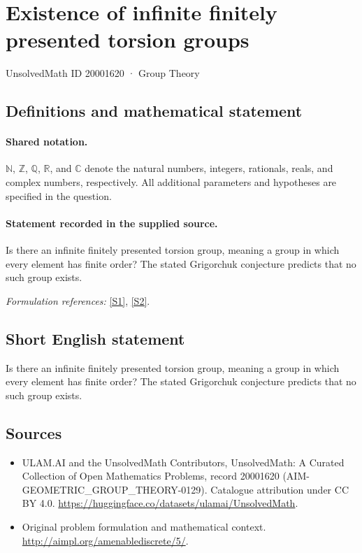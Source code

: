 \documentclass[11pt]{article}
\newcommand{\sref}[2]{\hyperlink{source:#1:#2}{[S#2]}}
\begin{document}
\setcounter{section}{20001619}
\section{Existence of infinite finitely presented torsion groups}\label{20001620}
{\small UnsolvedMath ID 20001620 · Group Theory}
\subsection{Definitions and mathematical statement}

\paragraph{Shared notation.}$\mathbb N$, $\mathbb Z$, $\mathbb Q$, $\mathbb R$, and $\mathbb C$ denote the natural numbers, integers, rationals, reals, and complex numbers, respectively. All additional parameters and hypotheses are specified in the question.


\paragraph{Statement recorded in the supplied source.}
Is there an infinite finitely presented torsion group, meaning a group in which every element has finite order? The stated Grigorchuk conjecture predicts that no such group exists.
\par\smallskip\textit{Formulation references:} \sref{20001620}{1}, \sref{20001620}{2}.
\subsection{Short English statement}
Is there an infinite finitely presented torsion group, meaning a group in which every element has finite order? The stated Grigorchuk conjecture predicts that no such group exists.
\subsection{Sources}
\begin{itemize}
\item[\hypertarget{source:20001620:1}{S1}] ULAM.AI and the UnsolvedMath Contributors, UnsolvedMath: A Curated Collection of Open Mathematics Problems, record 20001620 (AIM-GEOMETRIC\_GROUP\_THEORY-0129). Catalogue attribution under CC BY 4.0.
\url{https://huggingface.co/datasets/ulamai/UnsolvedMath}.
\item[\hypertarget{source:20001620:2}{S2}] Original problem formulation and mathematical context.
\url{http://aimpl.org/amenablediscrete/5/}.
\end{itemize}
\label{end:20001620}
\end{document}
